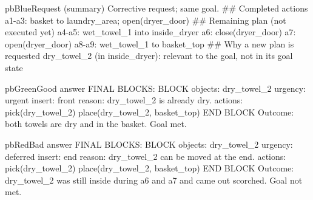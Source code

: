 \begin{tcbraster}[raster columns=3, raster equal height=rows, raster column skip=2.5mm, raster before skip=0mm, raster after skip=1mm]
\begin{promptbox}[unbreakable]{pbBlue}{Request (summary)}
Corrective request; same goal.
## Completed actions
a1-a3: basket to laundry_area; open(dryer_door)
## Remaining plan (not executed yet)
a4-a5: wet_towel_1 into inside_dryer
a6: close(dryer_door)   a7: open(dryer_door)
a8-a9: wet_towel_1 to basket_top
## Why a new plan is requested
dry_towel_2 (in inside_dryer): relevant to the goal, not in its goal state
\end{promptbox}
\begin{promptbox}[unbreakable]{pbGreen}{Good answer}
FINAL BLOCKS:
BLOCK
objects: dry_towel_2
urgency: urgent
insert: front
reason: dry_towel_2 is already dry.
actions:
pick(dry_towel_2)
place(dry_towel_2, basket_top)
END BLOCK
Outcome: both towels are dry and in the basket. Goal met.
\end{promptbox}
\begin{promptbox}[unbreakable]{pbRed}{Bad answer}
FINAL BLOCKS:
BLOCK
objects: dry_towel_2
urgency: deferred
insert: end
reason: dry_towel_2 can be moved at the end.
actions:
pick(dry_towel_2)
place(dry_towel_2, basket_top)
END BLOCK
Outcome: dry_towel_2 was still inside during a6 and a7 and came out scorched. Goal not met.
\end{promptbox}
\end{tcbraster}

